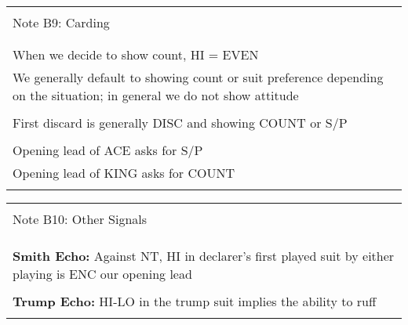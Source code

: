 \documentclass{article}
\begin{document}
\begin{tabular}{|l|}
\hline \\[-1em]
\cellcolor{green!25} \Large Note B9: Carding\\[-1em] 
\\ \hline
\\ \Large When we decide to show count, HI = EVEN
\\ \Large We generally default to showing count or suit preference depending on the situation; in general we do not show attitude \\
\\ \Large First discard is generally DISC and showing COUNT or S/P \\
\\ \Large Opening lead of ACE asks for S/P
\\ \Large Opening lead of KING asks for COUNT \\

\\ \hline
\end{tabular}

\begin{tabular}{|l|}
\hline \\[-1em]
\cellcolor{green!25} \Large Note B10: Other Signals \\[-1em] 
\\ \hline
\\
\\ \Large \textbf{Smith Echo:} Against NT, HI in declarer's first played suit by either playing is ENC our opening lead \\
\\ \Large \textbf{Trump Echo:} HI-LO in the trump suit implies the ability to ruff \\

\\ \hline
\end{tabular}
\end{document}
